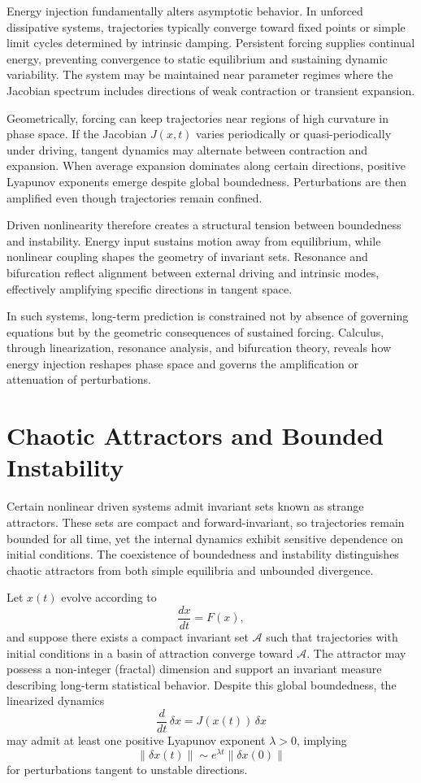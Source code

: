 \documentclass[12pt]{book}
\begin{document}
Energy injection fundamentally alters asymptotic behavior. In unforced dissipative systems, trajectories typically converge toward fixed points or simple limit cycles determined by intrinsic damping. Persistent forcing supplies continual energy, preventing convergence to static equilibrium and sustaining dynamic variability. The system may be maintained near parameter regimes where the Jacobian spectrum includes directions of weak contraction or transient expansion.

Geometrically, forcing can keep trajectories near regions of high curvature in phase space. If the Jacobian $J(x,t)$ varies periodically or quasi-periodically under driving, tangent dynamics may alternate between contraction and expansion. When average expansion dominates along certain directions, positive Lyapunov exponents emerge despite global boundedness. Perturbations are then amplified even though trajectories remain confined.

Driven nonlinearity therefore creates a structural tension between boundedness and instability. Energy input sustains motion away from equilibrium, while nonlinear coupling shapes the geometry of invariant sets. Resonance and bifurcation reflect alignment between external driving and intrinsic modes, effectively amplifying specific directions in tangent space.

In such systems, long-term prediction is constrained not by absence of governing equations but by the geometric consequences of sustained forcing. Calculus, through linearization, resonance analysis, and bifurcation theory, reveals how energy injection reshapes phase space and governs the amplification or attenuation of perturbations.

\section{Chaotic Attractors and Bounded Instability}

Certain nonlinear driven systems admit invariant sets known as strange attractors. These sets are compact and forward-invariant, so trajectories remain bounded for all time, yet the internal dynamics exhibit sensitive dependence on initial conditions. The coexistence of boundedness and instability distinguishes chaotic attractors from both simple equilibria and unbounded divergence.

Let $x(t)$ evolve according to
\[
\frac{dx}{dt} = F(x),
\]
and suppose there exists a compact invariant set $\mathcal{A}$ such that trajectories with initial conditions in a basin of attraction converge toward $\mathcal{A}$. The attractor may possess a non-integer (fractal) dimension and support an invariant measure describing long-term statistical behavior. Despite this global boundedness, the linearized dynamics
\[
\frac{d}{dt}\,\delta x = J(x(t))\,\delta x
\]
may admit at least one positive Lyapunov exponent $\lambda > 0$, implying
\[
\|\delta x(t)\| \sim e^{\lambda t} \|\delta x(0)\|
\]
for perturbations tangent to unstable directions.
\end{document}
